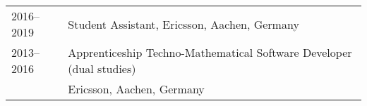 
\begin{longtable}[l]{@{}p{} p{}}
    2016--2019 & Student Assistant, Ericsson, Aachen, Germany\\
    2013--2016 & Apprenticeship Techno-Mathematical Software Developer (dual studies)\\
               & Ericsson, Aachen, Germany


\end{longtable}